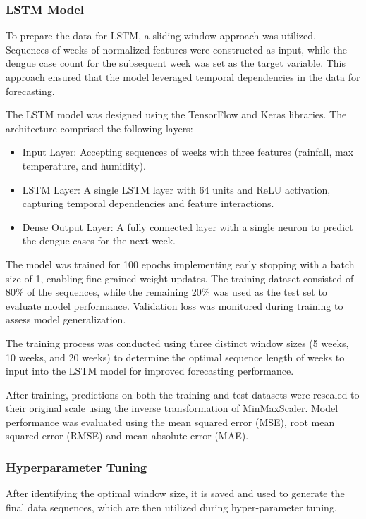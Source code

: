 \subsubsection{LSTM Model}
To prepare the data for LSTM, a sliding window approach was utilized. Sequences of weeks of normalized features were constructed as input, while the dengue case count for the subsequent week was set as the target variable. This approach ensured that the model leveraged temporal dependencies in the data for forecasting.

The LSTM model was designed using the TensorFlow and Keras libraries. The architecture comprised the following layers:
\begin{itemize}
	\item Input Layer: Accepting sequences of weeks with three features (rainfall, max temperature, and humidity).
	\item LSTM Layer: A single LSTM layer with 64 units and ReLU activation, capturing temporal dependencies and feature interactions.
	\item Dense Output Layer: A fully connected layer with a single neuron to predict the dengue cases for the next week.
\end{itemize}
The model was trained for 100 epochs implementing early stopping with a batch size of 1, enabling fine-grained weight updates. The training dataset consisted of 80\% of the sequences, while the remaining 20\% was used as the test set to evaluate model performance. Validation loss was monitored during training to assess model generalization.

The training process was conducted using three distinct window sizes (5 weeks, 10 weeks, and 20 weeks) to determine the optimal sequence length of weeks to input into the LSTM model for improved forecasting performance.

After training, predictions on both the training and test datasets were rescaled to their original scale using the inverse transformation of MinMaxScaler. Model performance was evaluated using the mean squared error (MSE), root mean squared error (RMSE) and mean absolute error (MAE).

\subsubsection{Hyperparameter Tuning}
After identifying the optimal window size, it is saved and used to generate the final data sequences, which are then utilized during hyper-parameter tuning.

